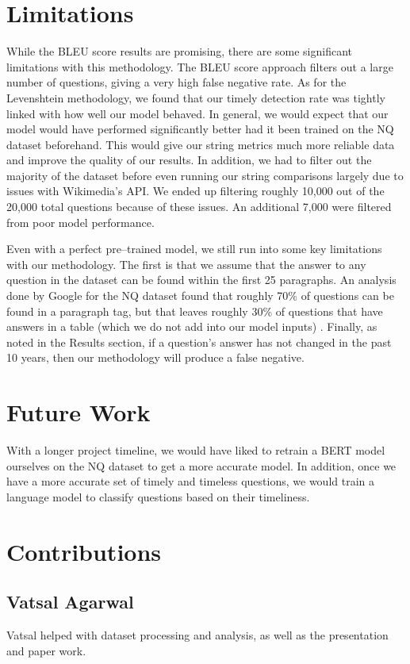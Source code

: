 \documentclass{article}
\begin{document}
\section{Limitations}
While the BLEU score results are promising, there are some significant
limitations with this methodology. The BLEU score approach filters out a large
number of questions, giving a very high false negative rate. As for the
Levenshtein methodology, we found that our timely detection rate was tightly
linked with how well our model behaved. In general, we would expect that our
model would have performed significantly better had it been trained on the NQ
dataset beforehand. This would give our string metrics much more reliable data
and improve the quality of our results. In addition, we had to filter out the
majority of the dataset before even running our string comparisons largely due
to issues with Wikimedia's API. We ended up filtering roughly 10,000 out of the
20,000 total questions because of these issues. An additional 7,000 were
filtered from poor model performance.

Even with a perfect pre--trained model, we still run into some key limitations
with our methodology. The first is that we assume that the answer to any
question in the dataset can be found within the first 25 paragraphs. An analysis
done by Google for the NQ dataset found that roughly 70\% of questions can be
found in a paragraph tag, but that leaves roughly 30\% of questions that have
answers in a table (which we do not add into our model inputs) \cite{nqdataset}.
Finally, as noted in the Results section, if a question’s answer has not changed
in the past 10 years, then our methodology will produce a false negative.


\section{Future Work}
With a longer project timeline, we would have liked to retrain a BERT model
ourselves on the NQ dataset to get a more accurate model. In addition, once we
have a more accurate set of timely and timeless questions, we would train a
language model to classify questions based on their timeliness.

\section{Contributions}
\subsection{Vatsal Agarwal}
Vatsal helped with dataset processing and analysis, as well as the presentation
and paper work.
\end{document}
